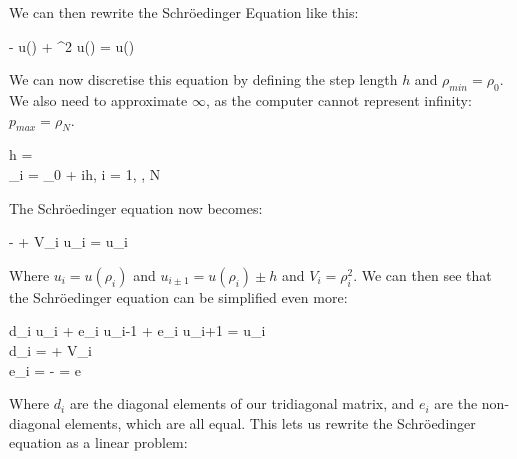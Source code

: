 \documentclass{article}
\begin{document}
			We can then rewrite the Schröedinger Equation like this:
			\begin{flalign*}
				-  u(\rho) + \rho^2 u(\rho) = \lambda u(\rho)
			\end{flalign*}

			We can now discretise this equation by defining the step length $h$ and $\rho_{min}=\rho_0$.
			We also need to approximate $\infty$, as the computer cannot represent infinity: $p_{max} = \rho_N$.
			\begin{flalign*}
				h = \frac{\rho_N - \rho_0}{N}\\
				\rho_i = \rho_0 + ih, \qquad i = 1, \hdots, N
			\end{flalign*}

			The Schröedinger equation now becomes:
			\begin{flalign*}
				-  + V_i u_i = \lambda u_i
			\end{flalign*}

			Where $u_i = u(\rho_i)$ and $u_{i\pm 1} = u(\rho_i) \pm h$ and $V_i = \rho_i^2$.
			We can then see that the Schröedinger equation can be simplified even more:
			\begin{flalign*}
				d_i u_i + e_i u_{i-1} + e_i u_{i+1} = \lambda u_i\\
				d_i = \frac{2}{h^2} + V_i\\
				e_i = - \frac{1}{h^2} = e
			\end{flalign*}

			Where $d_i$ are the diagonal elements of our tridiagonal matrix, and $e_i$ are
			the non-diagonal elements, which are all equal.
			This lets us rewrite the Schröedinger equation as a linear problem:
\end{document}
